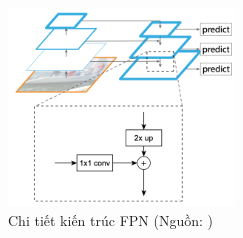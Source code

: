 {    \begin{figure}[H]
        \centering
        \includegraphics[width=6cm] {images/fpn_detail}
        \caption{Chi tiết kiến trúc FPN (Nguồn: \cite{lin2017feature})}
        \label{fig:fpn_detail}
    \end{figure}



}
